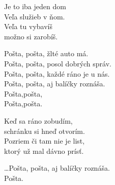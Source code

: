 
\ve{}
Je to iba jeden dom\\
Veľa služieb v ňom.\\
Veľa tu vybavíš\\
možno si zarobíš. 

\cho{}
Pošta, pošta, žlté auto má.\\
Pošta, pošta, posol dobrých správ.\\
Pošta, pošta, každé ráno je u nás.\\
Pošta, pošta, aj balíčky roznáša.\\
Pošta,pošta,\\
Pošta,pošta.

\ve{}
Keď sa ráno zobudím,\\
schránku si hneď otvorím.\\
Pozriem či tam nie je list,\\
ktorý už mal dávno prísť.


\cho{}
\ldots{}Pošta, pošta, aj balíčky roznáša.\\
Pošta. 

\esong